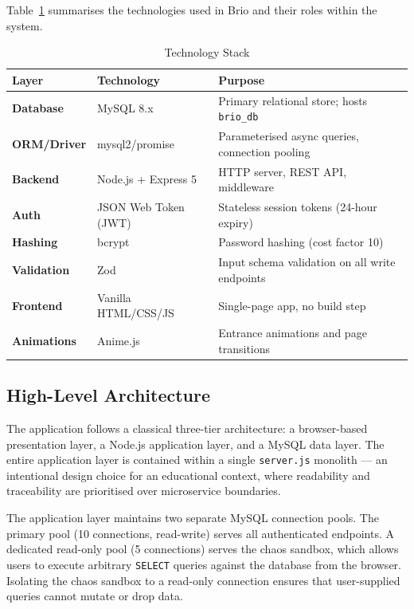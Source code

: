 \documentclass[12pt,a4paper]{article}
\begin{document}
Table~\ref{tab:stack} summarises the technologies used in Brio and their roles within the system.

\begin{table}[H]
\centering
\caption{Technology Stack}
\label{tab:stack}
\begin{tabular}{>{\bfseries}p{3cm} p{4.5cm} p{6cm}}
\toprule
Layer & Technology & Purpose \\
\midrule
Database & MySQL 8.x & Primary relational store; hosts \texttt{brio\_db} \\
ORM/Driver & mysql2/promise & Parameterised async queries, connection pooling \\
Backend & Node.js + Express 5 & HTTP server, REST API, middleware \\
Auth & JSON Web Token (JWT) & Stateless session tokens (24-hour expiry) \\
Hashing & bcrypt & Password hashing (cost factor 10) \\
Validation & Zod & Input schema validation on all write endpoints \\
Frontend & Vanilla HTML/CSS/JS & Single-page app, no build step \\
Animations & Anime.js & Entrance animations and page transitions \\
\bottomrule
\end{tabular}
\end{table}

\subsection{High-Level Architecture}

The application follows a classical three-tier architecture: a browser-based presentation layer,
a Node.js application layer, and a MySQL data layer. The entire application layer is contained
within a single \texttt{server.js} monolith --- an intentional design choice for an educational
context, where readability and traceability are prioritised over microservice boundaries.

The application layer maintains two separate MySQL connection pools. The primary pool (10
connections, read-write) serves all authenticated endpoints. A dedicated read-only pool (5
connections) serves the chaos sandbox, which allows users to execute arbitrary \texttt{SELECT}
queries against the database from the browser. Isolating the chaos sandbox to a read-only
connection ensures that user-supplied queries cannot mutate or drop data.
\end{document}
